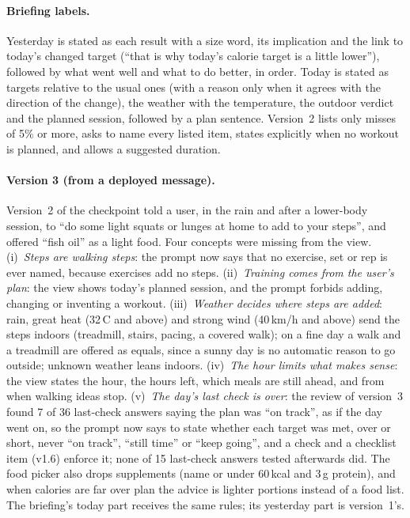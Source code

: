 \documentclass[10pt,twocolumn]{article}
\begin{document}
\paragraph{Briefing labels.} Yesterday is stated as each result with a size word, its implication and the link to
today's changed target (``that is why today's calorie target is a little lower''), followed by what went well and
what to do better, in order. Today is stated as targets relative to the usual ones (with a reason only when it agrees
with the direction of the change), the weather with the temperature, the outdoor verdict and the planned session,
followed by a plan sentence. Version~2 lists only misses of 5\% or more, asks to name every listed item, states
explicitly when no workout is planned, and allows a suggested duration.

\paragraph{Version 3 (from a deployed message).} Version~2 of the checkpoint told a user, in the rain and after a
lower-body session, to ``do some light squats or lunges at home to add to your steps'', and offered ``fish oil'' as a
light food. Four concepts were missing from the view. (i)~\emph{Steps are walking steps}: the prompt now says that no
exercise, set or rep is ever named, because exercises add no steps. (ii)~\emph{Training comes from the user's
plan}: the view shows today's planned session, and the prompt forbids adding, changing or inventing a workout.
(iii)~\emph{Weather decides where steps are added}: rain, great heat (32\,\textdegree{}C and above) and strong wind
(40\,km/h and above) send the steps indoors (treadmill, stairs, pacing, a covered walk); on a fine day a walk and
a treadmill are offered as equals, since a sunny day is no automatic reason to go outside; unknown weather leans
indoors. (iv)~\emph{The hour limits what makes sense}: the view states the hour, the hours left, which meals are still
ahead, and from when walking ideas stop. (v)~\emph{The day's last check is over}: the review of version~3 found
7 of 36 last-check answers saying the plan was ``on track'', as if the day went on, so the prompt now says to state
whether each target was met, over or short, never ``on track'', ``still time'' or ``keep going'', and a check and a
checklist item (v1.6) enforce it; none of 15 last-check answers tested afterwards did. The food picker also drops supplements (name or under 60\,kcal and 3\,g
protein), and when calories are far over plan the advice is lighter portions instead of a food list. The briefing's
today part receives the same rules; its yesterday part is version~1's.
\end{document}
